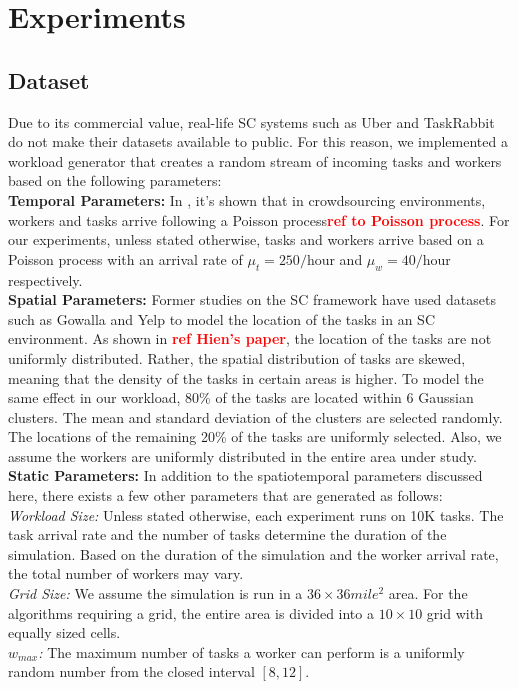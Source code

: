 \section{Experiments}

\subsection{Dataset}
Due to its commercial value, real-life SC systems such as Uber and TaskRabbit do not make their datasets available to public. For this reason, we implemented a workload generator that creates a random stream of incoming tasks and workers based on the following parameters:\\
\textbf{Temporal Parameters:} In \cite{Basu15}, it's shown that in crowdsourcing environments, workers and tasks arrive following a Poisson process\textcolor{red}{\textbf{ref to Poisson process}}. For our experiments, unless stated otherwise, tasks and workers arrive based on a Poisson process with an arrival rate of $\mu_t = 250/$hour and $\mu_w = 40/$hour respectively.\\
\textbf{Spatial Parameters:} Former studies on the SC framework \cite{Kazemi12, Kazemi13, Deng13} have used datasets such as Gowalla and Yelp  to model the location of the tasks in an SC environment. As shown in \textcolor{red}{\textbf{ref Hien's paper}}, the location of the tasks are not uniformly distributed. Rather, the spatial distribution of tasks are skewed, meaning that the density of the tasks in certain areas is higher. To model the same effect in our workload, 80\% of the tasks are located within 6 Gaussian clusters. The mean and standard deviation of the clusters are selected randomly. The locations of the remaining 20\% of the tasks are uniformly selected. Also, we assume the workers are uniformly distributed in the entire area under study.\\
\textbf{Static Parameters:} In addition to the spatiotemporal parameters discussed here, there exists a few other parameters that are generated as follows:\\
\emph{Workload Size:} Unless stated otherwise, each experiment runs on 10K tasks. The task arrival rate and the number of tasks determine the duration of the simulation. Based on the duration of the simulation and the worker arrival rate, the total number of workers may vary.\\
\emph{Grid Size:} We assume the simulation is run in a $36 \times 36 mile^2$ area. For the algorithms requiring a grid, the entire area is divided into a $10 \times 10$ grid with equally sized cells.\\
\emph{$w_{max}$:} The maximum number of tasks a worker can perform is a uniformly random number from the closed interval $\left[8,12 \right]$.

